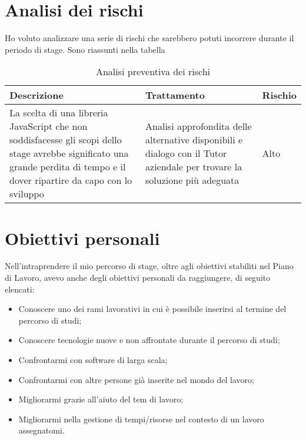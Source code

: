 \section {Analisi dei rischi}
Ho voluto analizzare una serie di rischi che sarebbero potuti incorrere durante il periodo di stage. Sono riassunti nella tabella\\ %

\begin{table} %
\centering
\caption{Analisi preventiva dei rischi}
\label{tab:analisi-dei-rischi}
\begin{tabular}{|p{5cm}|p{5cm}|p{3cm}|}
\hline
Descrizione & Trattamento & Rischio\\
\hline
La scelta di una libreria JavaScript che non soddisfacesse gli scopi dello stage avrebbe significato una grande perdita di tempo e il dover ripartire da capo con lo sviluppo & Analisi approfondita delle alternative disponibili e dialogo con il Tutor aziendale per trovare la soluzione più adeguata & Alto\\
\hline


\end{tabular}
\end{table}

\section {Obiettivi personali}
Nell'intraprendere il mio percorso di stage, oltre agli obiettivi stabiliti nel Piano di Lavoro, avevo anche degli obiettivi personali da raggiungere, di seguito elencati:
\begin{itemize}
\item Conoscere uno dei rami lavorativi in cui è possibile inserirsi al termine del percorso di studi;
\item Conoscere tecnologie nuove e non affrontate durante il percorso di studi;
\item Confrontarmi con software di larga scala;
\item Confrontarmi con altre persone già inserite nel mondo del lavoro;
\item Migliorarmi grazie all'aiuto del tem di lavoro;
\item Migliorarmi nella gestione di tempi/risorse nel contesto di un lavoro assegnatomi.
\end{itemize}